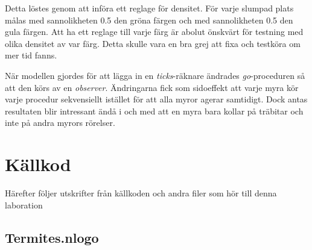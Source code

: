 \documentclass[titlepage, a4paper, 12pt]{article}
\begin{document}
Detta löstes genom att införa ett reglage för densitet. För varje
slumpad plats målas med sannolikheten 0.5 den gröna färgen och med
sannolikheten 0.5 den gula färgen. Att ha ett reglage till varje färg
är abolut önskvärt för testning med olika densitet av var färg. Detta
skulle vara en bra grej att fixa och testköra om mer tid fanns.

När modellen gjordes för att lägga in en \textit{ticks}-räknare
ändrades \textit{go}-proceduren så att den körs av en
\textit{observer}. Ändringarna fick som sidoeffekt att varje myra kör
varje procedur sekvensiellt istället för att alla myror agerar
samtidigt. Dock antas resultaten blir intressant ändå i och med
att en myra bara kollar på träbitar och inte på andra myrors
rörelser. %

\newpage
\appendix
{}
\section{Källkod}\label{sec:kallkod}
Härefter följer utskrifter från källkoden och andra filer som hör till
denna laboration

\subsection{Termites.nlogo}\label{Termites.nlogo}
\begin{footnotesize}
  
\end{footnotesize}
\end{document}
